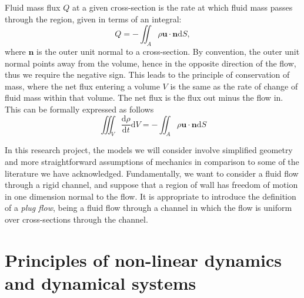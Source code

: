 \documentclass{book}
\begin{document}
Fluid mass flux $Q$ at a given cross-section is the rate at which fluid mass passes through the region,
given in terms of an integral:
\begin{equation*}
    Q = -\iint_A \rho \mathbf{u} \cdot \mathbf{n} \mathrm{d}S,
\end{equation*}
where $\mathbf{n}$ is the outer unit normal to a cross-section.
By convention, the outer unit normal points away from the volume,
hence in the opposite direction of the flow, thus we require the negative sign.
This leads to the principle of conservation of mass, where the net flux entering a volume $V$ is the same as the rate of change of fluid mass within that volume.
The net flux is the flux out minus the flow in.
This can be formally expressed as follows
\begin{equation*}
    \iiint_V \frac{\mathrm{d}\rho}{\mathrm{d}t} \mathrm{d}V = - \iint_A \rho \mathbf{u} \cdot \mathbf{n} \mathrm{d}S 
\end{equation*} 

In this research project, the models we will consider involve simplified geometry and more straightforward assumptions of mechanics in comparison to some of the literature we have acknowledged.
Fundamentally, we want to consider a fluid flow through a rigid channel, and suppose that a region of wall has freedom of motion in one dimension normal to the flow.
It is appropriate to introduce the definition of a \textit{plug flow}, being a fluid flow through a channel in which the flow is uniform over cross-sections through the channel. 


\section{Principles of non-linear dynamics and dynamical systems}
\end{document}
